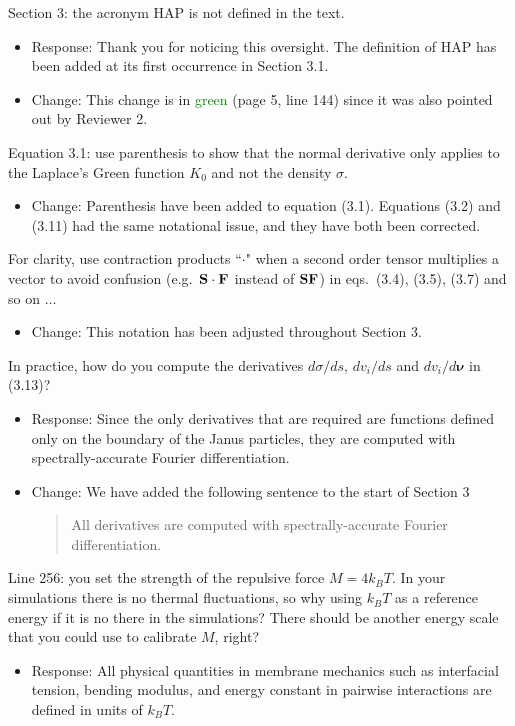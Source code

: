 \documentclass[11pt]{article}
\newcommand{\comment}[1]{{\color{blue} #1}}
\begin{document}
\noindent
\comment{Section 3: the acronym HAP is not defined in the text.}
\begin{itemize}
  \item Response: Thank you for noticing this oversight. The definition of HAP has
    been added at its first occurrence in Section 3.1. 
  \item Change: This change is in \textcolor{green}{green} (page 5, line 144) since it was also pointed
    out by Reviewer 2.
\end{itemize}

\noindent
\comment{Equation 3.1: use parenthesis to show that the normal
derivative only applies to the Laplace’s Green function $K_0$ and not
the density $\sigma$.}
\begin{itemize}
  \item Change: Parenthesis have been added to equation (3.1).  Equations (3.2) and (3.11) had the same notational issue, and
    they have both been corrected.
\end{itemize}

\noindent
\comment{For clarity, use contraction products ``$\cdot$" when a second
order tensor multiplies a vector to avoid confusion (e.g.~${\bf S} \cdot
{\bf F}$ instead of ${\bf SF}$) in eqs.~(3.4), (3.5), (3.7) and so on
$\ldots$}
\begin{itemize}
  \item Change: This notation has been adjusted throughout Section 3.
\end{itemize}

\noindent
\comment{In practice, how do you compute the derivatives $d\sigma /ds$,
$dv_i/ds$ and $dv_i/d\boldsymbol{\nu}$ in (3.13)?}
\begin{itemize}
  \item Response: Since the only derivatives that are required are functions
    defined only on the boundary of the Janus particles, they are
    computed with spectrally-accurate Fourier differentiation.

  \item Change: We have added the following sentence to the start of Section 3
    \begin{quotation}
      All derivatives are computed with spectrally-accurate Fourier
      differentiation.
    \end{quotation}
\end{itemize}

\noindent
\comment{Line 256: you set the strength of the repulsive force $M = 4k_B
T$. In your simulations there is no thermal fluctuations, so why using
$k_B T$ as a reference energy if it is no there in the simulations?
There should be another energy scale that you could use to calibrate
$M$, right?}
\begin{itemize}
  \item Response: All physical quantities in membrane mechanics such as interfacial tension, bending  modulus, and energy constant in pairwise interactions are defined in units of $k_BT$. 
\end{itemize}
\end{document}
